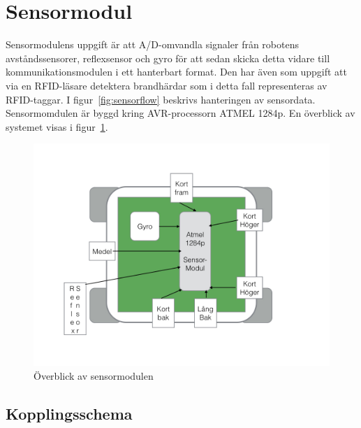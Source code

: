 \documentclass[a4paper,12pt,fleqn]{article}
\begin{document}
\newpage



\section{Sensormodul}
Sensormodulens uppgift är att A/D-omvandla signaler från robotens avståndssensorer, reflexsensor och gyro för att sedan skicka detta vidare till kommunikationsmodulen i ett hanterbart format. Den har även som uppgift att via en RFID-läsare detektera brandhärdar som i detta fall representeras av RFID-taggar. I figur~\ref{fig:sensorflow} beskrivs hanteringen av sensordata. Sensormomdulen är byggd kring AVR-processorn ATMEL 1284p. En överblick av systemet visas i figur~\ref{fig:sensoroverview}.

\begin{figure}[htp] %
  \begin{center}
  \includegraphics[keepaspectratio=true,width=\linewidth]{bilder/overblicksensor}  %
  \end{center}
  \caption{Överblick av sensormodulen} %
  \label{fig:sensoroverview}
\end{figure}

\subsection{Kopplingsschema}
\end{document}
